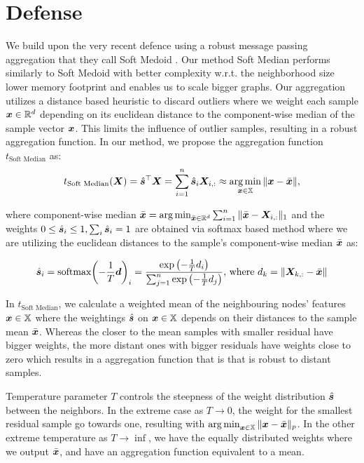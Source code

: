 \documentclass[sigconf,authordraft]{acmart}
\newcommand{\features}{\mX}
\newcommand{\featset}{\sX}
\newcommand{\softout}{\vs}
\begin{document}
\section{Defense}

We build upon the very recent defence using a robust message passing aggregation that they call Soft Medoid \cite{Geisler2020}. Our method Soft Median performs similarly to Soft Medoid with better complexity w.r.t. the neighborhood size lower memory footprint and enables us to scale bigger graphs. Our aggregation utilizes a distance based heuristic to discard outliers where we weight each sample ${\bm{x}} \in \mathbb{R}^d$ depending on its euclidean distance to the component-wise median of the sample vector ${\bm{x}}$. This limits the influence of outlier samples, resulting in a robust aggregation function. In our method, we propose the aggregation function \(t_{\text{Soft Median}}\) as:
\begin{equation}\label{eq:softmedian}
  t_{\text{Soft Median}}(\features) = \hat{\softout}^\top\features = \sum_{i=1}^n \hat{\softout}_i \features_{i,:} \approx \argmin_{\vx \in \featset} \| \vx - \bar{\vx} \|,
\end{equation}

where component-wise median \(\bar{\vx} = \argmin_{\bar{\vx} \in \R^d} \sum_{i=1}^n \|\bar{\vx} - \features_{i,:}\|_1 \) and the weights \(0 \leq \hat{\softout}_i \leq 1, \sum_i \hat{\softout}_i = 1\) are obtained via softmax based method where we are utilizing the euclidean distances to the sample's component-wise median $\bar{{\bm{x}}}$ as:

\begin{equation}\label{eq:softmaxdist}
  \hat{\softout}_i
  = \text{softmax}{\left(-\frac{1}{T} \vd \right )}_i = \frac{\exp{\left(-\frac{1}{T} \evd_i \right )}}{\sum_{j=1 }^n \exp{\left (-\frac{1}{T} \evd_j \right )}} \text{,~where}~\evd_k = \|\features_{k,:} - \bar{\vx}\|
\end{equation}


In \(t_{\text{Soft Median}}\), we calculate a weighted mean of the neighbouring nodes' features $\vx \in \featset$ where the weightings $\hat{\softout}$ on $\vx \in \featset$  depends on their distances to the sample mean $\bar{{\bm{x}}}$. Whereas the closer to the mean samples with smaller residual have bigger weights, the more distant ones with bigger residuals have weights close to zero which results in a aggregation function that is that is robust to distant samples.

Temperature parameter $T$ controls the steepness of the weight distribution $\hat{\softout}$ between the neighbors. In the extreme case as $T\to0$, the weight for the smallest residual sample go towards one, resulting with $\argmin_{\vx \in \featset} \| \vx - \bar{\vx} \|_p$. In the other extreme temperature as $T\to\inf$, we have the equally distributed weights where we output $\bar{{\bm{x}}}$, and have an aggregation function equivalent to a mean.
\end{document}
